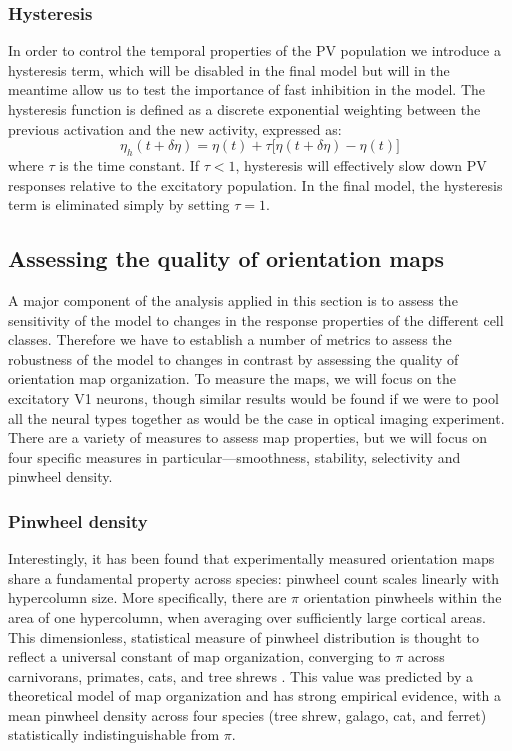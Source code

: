 \subsubsection{Hysteresis}

In order to control the temporal properties of the PV population we
introduce a hysteresis term, which will be disabled in the final
model but will in the meantime allow us to test the importance of fast
inhibition in the model. The hysteresis function is defined as a discrete
exponential weighting between the previous activation and the new
activity, expressed as:
\begin{equation}
  \eta_h (t + \delta\eta) = \eta(t) + \tau \big[ \eta(t+\delta\eta) - \eta(t) \big]
\end{equation}
where $\tau$ is the time constant. If $\tau < 1$, hysteresis will
effectively slow down PV responses relative to the excitatory
population. In the final model, the hysteresis term is eliminated simply by
setting $\tau = 1$.

\subsection{Assessing the quality of orientation maps} \label{metrics}

A major component of the analysis applied in this section is to assess
the sensitivity of the model to changes in the response properties of
the different cell classes. Therefore we have to establish a number of
metrics to assess the robustness of the model to changes in contrast
by assessing the quality of orientation map organization.  To measure
the maps, we will focus on the excitatory V1 neurons, though similar
results would be found if we were to pool all the neural types
together as would be the case in optical imaging experiment.  There
are a variety of measures to assess map properties, but we will focus
on four specific measures in particular---smoothness, stability,
selectivity and pinwheel density.

\subsubsection{Pinwheel density}

Interestingly, it has been found that experimentally measured
orientation maps share a fundamental property across species: pinwheel
count scales linearly with hypercolumn size.  More specifically,
there are $\pi$ orientation pinwheels within the area of one
hypercolumn, when averaging over sufficiently large cortical
areas. This dimensionless, statistical measure of pinwheel
distribution is thought to reflect a universal constant of map
organization, converging to $\pi$ across carnivorans, primates, cats, and
tree shrews \citep{Kaschube2010, Keil2012}. This value was predicted
by a theoretical model of map organization and has strong empirical
evidence, with a mean pinwheel density across four species (tree
shrew, galago, cat, and ferret) statistically indistinguishable from
$\pi$.

